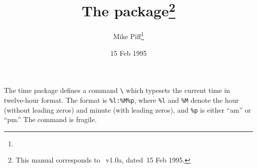 \documentclass[pagesize=auto, fontsize=14pt, parskip=full, DIV=9]{scrartcl}
\title{The \pkg{time} package\thanks{This manual corresponds to \pkg{time.sty}~v1.0a, dated~15 Feb 1995.}}
\author{Mike Piff\thanks{\mail{M.Piff@sheffield.ac.uk}}}
\date{15 Feb 1995}
\makeatletter
\newcommand*{\pkg}[1]{\textsf{#1}}
\newcommand*{\cs}[1]{\texttt{\textbackslash#1}}
\newcommand*{\cmd}[1]{\cs{\expandafter\@gobble\string#1}}
\makeatother
\begin{document}
\maketitle

The \pkg{time} package defines a command \cmd{\now} which typesets the current time in twelve-hour format.
The format is \verb|%l:%M%p|, where \verb|%l| and \verb|%M| denote the hour (without leading zeros) and minute (with leading zeros), and \verb|%p| is either ``am'' or ``pm.''
The command is fragile.
\end{document}
